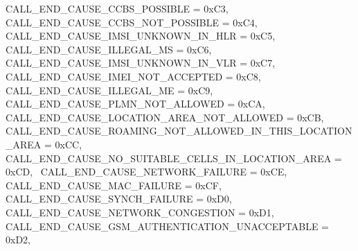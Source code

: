 \begin{DoxyItemize}
 C\+A\+L\+L\+\_\+\+E\+N\+D\+\_\+\+C\+A\+U\+S\+E\+\_\+\+C\+C\+B\+S\+\_\+\+P\+O\+S\+S\+I\+B\+LE = 0x\+C3,~\newline
 C\+A\+L\+L\+\_\+\+E\+N\+D\+\_\+\+C\+A\+U\+S\+E\+\_\+\+C\+C\+B\+S\+\_\+\+N\+O\+T\+\_\+\+P\+O\+S\+S\+I\+B\+LE = 0x\+C4,~\newline
 C\+A\+L\+L\+\_\+\+E\+N\+D\+\_\+\+C\+A\+U\+S\+E\+\_\+\+I\+M\+S\+I\+\_\+\+U\+N\+K\+N\+O\+W\+N\+\_\+\+I\+N\+\_\+\+H\+LR = 0x\+C5,~\newline
 C\+A\+L\+L\+\_\+\+E\+N\+D\+\_\+\+C\+A\+U\+S\+E\+\_\+\+I\+L\+L\+E\+G\+A\+L\+\_\+\+MS = 0x\+C6,~\newline
 C\+A\+L\+L\+\_\+\+E\+N\+D\+\_\+\+C\+A\+U\+S\+E\+\_\+\+I\+M\+S\+I\+\_\+\+U\+N\+K\+N\+O\+W\+N\+\_\+\+I\+N\+\_\+\+V\+LR = 0x\+C7,~\newline
 C\+A\+L\+L\+\_\+\+E\+N\+D\+\_\+\+C\+A\+U\+S\+E\+\_\+\+I\+M\+E\+I\+\_\+\+N\+O\+T\+\_\+\+A\+C\+C\+E\+P\+T\+ED = 0x\+C8,~\newline
 C\+A\+L\+L\+\_\+\+E\+N\+D\+\_\+\+C\+A\+U\+S\+E\+\_\+\+I\+L\+L\+E\+G\+A\+L\+\_\+\+ME = 0x\+C9,~\newline
 C\+A\+L\+L\+\_\+\+E\+N\+D\+\_\+\+C\+A\+U\+S\+E\+\_\+\+P\+L\+M\+N\+\_\+\+N\+O\+T\+\_\+\+A\+L\+L\+O\+W\+ED = 0x\+CA,~\newline
 C\+A\+L\+L\+\_\+\+E\+N\+D\+\_\+\+C\+A\+U\+S\+E\+\_\+\+L\+O\+C\+A\+T\+I\+O\+N\+\_\+\+A\+R\+E\+A\+\_\+\+N\+O\+T\+\_\+\+A\+L\+L\+O\+W\+ED = 0x\+CB,~\newline
 C\+A\+L\+L\+\_\+\+E\+N\+D\+\_\+\+C\+A\+U\+S\+E\+\_\+\+R\+O\+A\+M\+I\+N\+G\+\_\+\+N\+O\+T\+\_\+\+A\+L\+L\+O\+W\+E\+D\+\_\+\+I\+N\+\_\+\+T\+H\+I\+S\+\_\+\+L\+O\+C\+A\+T\+I\+O\+N\+\_\+\+A\+R\+EA = 0x\+CC,~\newline
 C\+A\+L\+L\+\_\+\+E\+N\+D\+\_\+\+C\+A\+U\+S\+E\+\_\+\+N\+O\+\_\+\+S\+U\+I\+T\+A\+B\+L\+E\+\_\+\+C\+E\+L\+L\+S\+\_\+\+I\+N\+\_\+\+L\+O\+C\+A\+T\+I\+O\+N\+\_\+\+A\+R\+EA = 0x\+CD,~\newline
 C\+A\+L\+L\+\_\+\+E\+N\+D\+\_\+\+C\+A\+U\+S\+E\+\_\+\+N\+E\+T\+W\+O\+R\+K\+\_\+\+F\+A\+I\+L\+U\+RE = 0x\+CE,~\newline
 C\+A\+L\+L\+\_\+\+E\+N\+D\+\_\+\+C\+A\+U\+S\+E\+\_\+\+M\+A\+C\+\_\+\+F\+A\+I\+L\+U\+RE = 0x\+CF,~\newline
 C\+A\+L\+L\+\_\+\+E\+N\+D\+\_\+\+C\+A\+U\+S\+E\+\_\+\+S\+Y\+N\+C\+H\+\_\+\+F\+A\+I\+L\+U\+RE = 0x\+D0,~\newline
 C\+A\+L\+L\+\_\+\+E\+N\+D\+\_\+\+C\+A\+U\+S\+E\+\_\+\+N\+E\+T\+W\+O\+R\+K\+\_\+\+C\+O\+N\+G\+E\+S\+T\+I\+ON = 0x\+D1,~\newline
 C\+A\+L\+L\+\_\+\+E\+N\+D\+\_\+\+C\+A\+U\+S\+E\+\_\+\+G\+S\+M\+\_\+\+A\+U\+T\+H\+E\+N\+T\+I\+C\+A\+T\+I\+O\+N\+\_\+\+U\+N\+A\+C\+C\+E\+P\+T\+A\+B\+LE = 0x\+D2,~\newline

\end{DoxyItemize}
